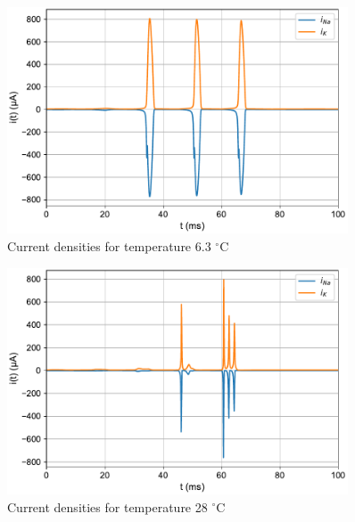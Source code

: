 \documentclass{scrartcl}
\begin{document}
\newpage
\begin{figure}[h]
	\centering
	\includegraphics[width=0.9\textwidth]{figures/currents_temp6.3.pdf}
	\caption{Current densities for temperature 6.3 $^{\circ}$C}
	\label{fig:currents_temp6_3}
\end{figure}
\begin{figure}[h!]
	\centering
	\includegraphics[width=0.9\textwidth]{figures/currents_temp28.pdf}
	\caption{Current densities for temperature 28 $^{\circ}$C}
	\label{fig:currents_temp28}
\end{figure}
\end{document}
